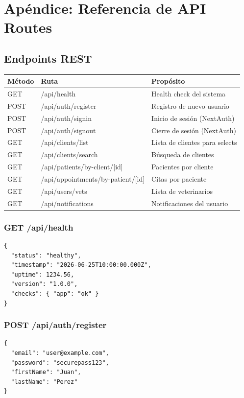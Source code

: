 \chapter{Ap\'endice: Referencia de API Routes}

\section{Endpoints REST}

\begin{longtable}{|l|l|l|}
\hline
\textbf{M\'etodo} & \textbf{Ruta} & \textbf{Prop\'osito} \\
\hline
\endhead
GET & /api/health & Health check del sistema \\
POST & /api/auth/register & Registro de nuevo usuario \\
POST & /api/auth/signin & Inicio de sesi\'on (NextAuth) \\
POST & /api/auth/signout & Cierre de sesi\'on (NextAuth) \\
GET & /api/clients/list & Lista de clientes para selects \\
GET & /api/clients/search & B\'usqueda de clientes \\
GET & /api/patients/by-client/[id] & Pacientes por cliente \\
GET & /api/appointments/by-patient/[id] & Citas por paciente \\
GET & /api/users/vets & Lista de veterinarios \\
GET & /api/notifications & Notificaciones del usuario \\
\hline
\end{longtable}

\subsection{GET /api/health}

\begin{lstlisting}[style=json, caption=Respuesta de health check]
{
  "status": "healthy",
  "timestamp": "2026-06-25T10:00:00.000Z",
  "uptime": 1234.56,
  "version": "1.0.0",
  "checks": { "app": "ok" }
}
\end{lstlisting}

\subsection{POST /api/auth/register}

\begin{lstlisting}[style=json, caption=Peticion de registro]
{
  "email": "user@example.com",
  "password": "securepass123",
  "firstName": "Juan",
  "lastName": "Perez"
}
\end{lstlisting}

